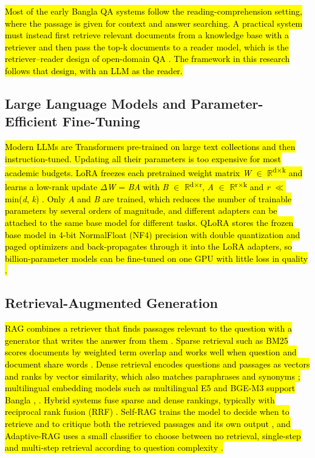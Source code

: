 \hl{Most of the early Bangla QA systems follow the reading-comprehension
setting, where the passage is given for context and answer searching. A
practical system must instead first retrieve relevant documents from a
knowledge base with a retriever and then pass the top-k documents to a
reader model, which is the retriever--reader design of open-domain QA
\cite{karpukhin2020dpr}. The framework in this research follows that design, with an
LLM as the reader.}

\subsection{Large Language Models and Parameter-Efficient Fine-Tuning}\label{large-language-models-and-parameter-efficient-fine-tuning}

\hl{Modern LLMs are Transformers pre-trained on large text collections
and then instruction-tuned. Updating all their parameters is too
expensive for most academic budgets. LoRA freezes each pretrained weight
matrix \emph{W} \ensuremath{\in} \ensuremath{\mathbb{R}}\textsuperscript{d\ensuremath{\times}k} and learns a low-rank update
\ensuremath{\Delta}\emph{W} = \emph{BA} with \emph{B} \ensuremath{\in} \ensuremath{\mathbb{R}}\textsuperscript{d\ensuremath{\times}r}, \emph{A} \ensuremath{\in}
\ensuremath{\mathbb{R}}\textsuperscript{r\ensuremath{\times}k} and \emph{r} \ensuremath{\ll} min(\emph{d}, \emph{k}) \cite{hu2022lora}.
Only \emph{A} and \emph{B} are trained, which reduces the number of
trainable parameters by several orders of magnitude, and different
adapters can be attached to the same base model for different tasks.
QLoRA stores the frozen base model in 4-bit NormalFloat (NF4) precision
with double quantization and paged optimizers and back-propagates
through it into the LoRA adapters, so billion-parameter models can be
fine-tuned on one GPU with little loss in quality \cite{dettmers2023qlora}.}

\subsection{Retrieval-Augmented Generation}\label{retrieval-augmented-generation}

\hl{RAG combines a retriever that finds passages relevant to the
question with a generator that writes the answer from them \cite{lewis2020rag}.
Sparse retrieval such as BM25 scores documents by weighted term overlap
and works well when question and document share words \cite{robertson2009bm25}. Dense
retrieval encodes questions and passages as vectors and ranks by vector
similarity, which also matches paraphrases and synonyms \cite{karpukhin2020dpr};
multilingual embedding models such as multilingual E5 and BGE-M3 support
Bangla \cite{chen2024bgem3}, \cite{wang2024me5}. Hybrid systems fuse sparse and dense
rankings, typically with reciprocal rank fusion (RRF) \cite{cormack2009rrf}. Self-RAG
trains the model to decide when to retrieve and to critique both the
retrieved passages and its own output \cite{asai2024selfrag}, and Adaptive-RAG uses a
small classifier to choose between no retrieval, single-step and
multi-step retrieval according to question complexity \cite{jeong2024adaptiverag}.}

